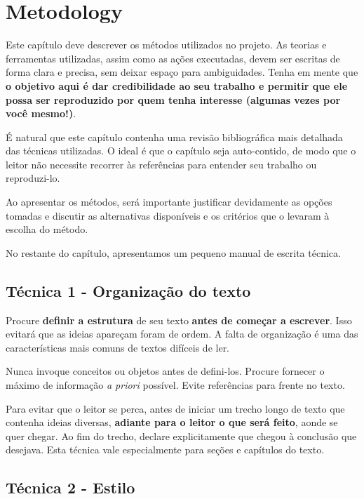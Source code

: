 \chapter{Metodology}
\label{chap:Metodology}

Este capítulo deve descrever os métodos utilizados no projeto. As teorias e ferramentas utilizadas, assim como as ações executadas, devem ser escritas de forma clara e precisa, sem deixar espaço para ambiguidades. Tenha em mente que \textbf{o objetivo aqui é dar credibilidade ao seu trabalho e permitir que ele possa ser reproduzido por quem tenha interesse (algumas vezes por você mesmo!)}. 

É natural que este capítulo contenha uma revisão bibliográfica mais detalhada das técnicas utilizadas. O ideal é que o capítulo seja auto-contido, de modo que o leitor não necessite recorrer às referências para entender seu trabalho ou reproduzi-lo.

Ao apresentar os métodos, será importante justificar devidamente as opções tomadas e discutir as alternativas disponíveis e os critérios que o levaram à escolha do método.

No restante do capítulo, apresentamos um pequeno manual de escrita técnica.

\section{Técnica 1 - Organização do texto}
\label{sec:metodo1}

Procure \textbf{definir a estrutura} de seu texto \textbf{antes de começar a escrever}. Isso evitará que as ideias apareçam foram de ordem. A falta de organização é uma das características mais comuns de textos difíceis de ler.

Nunca invoque conceitos ou objetos antes de defini-los. Procure fornecer o máximo de informação \emph{a priori} possível. Evite referências para frente no texto. 

Para evitar que o leitor se perca, antes de iniciar um trecho longo de texto que contenha ideias diversas, \textbf{adiante para o leitor o que será feito}, aonde se quer chegar. Ao fim do trecho, declare explicitamente que chegou à conclusão que desejava. Esta técnica vale especialmente para seções e capítulos do texto. 

\section{Técnica 2 - Estilo}
\label{sec:estilo}

